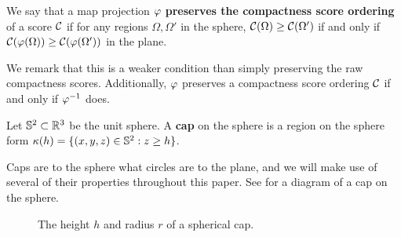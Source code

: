 \begin{definition}
  We say that a map projection $\varphi$ \textbf{preserves the  
  compactness score ordering} of a score $\mathcal{C}$ if for any regions 
  $\Omega,\Omega'$ in the sphere, $\mathcal{C}(\Omega)\ge \mathcal{C}(\Omega')$ 
  if and only if $\mathcal{C}(\varphi(\Omega)) \ge \mathcal{C}(\varphi(\Omega'))$ in the plane.
\end{definition}

  We remark that this is a weaker condition than simply preserving the raw compactness scores.  Additionally, $\varphi$ preserves a compactness score ordering $\mathcal{C}$ 
  if and only if $\varphi^{-1}$ does.

\begin{definition}
  Let $\mathbb{S}^2\subset \mathbb{R}^3$ be the unit sphere. A 
  \textbf{cap} on the sphere is a region on the sphere
  form $\kappa(h) = \{(x,y,z)\in \mathbb{S}^2: z\ge h\}$.
\end{definition}

Caps are to the sphere what circles are to the plane, and we will make use of several of their properties throughout this paper. See  for a diagram of a cap on the sphere.

\begin{figure}[h]
  \centering
  
  \caption{ The height $h$ and radius $r$ of a spherical cap. }
  \label{fig:caphr}
\end{figure}






